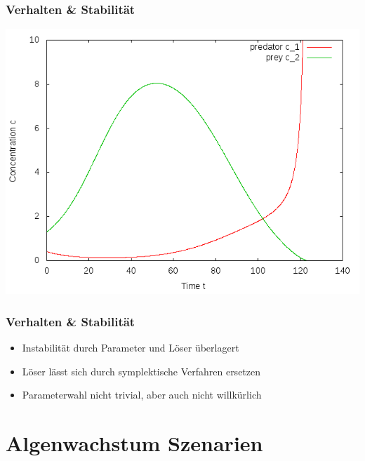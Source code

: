 \documentclass[12pt]{beamer}
\begin{document}
    \begin{frame}
    \frametitle{Verhalten \& Stabilität}
    \includegraphics[scale=0.5]{n2_explodiert.png}
    \end{frame}
    
    \begin{frame}
    \frametitle{Verhalten \& Stabilität}
    \begin{itemize}
      \item Instabilität durch Parameter und Löser überlagert
      \item Löser lässt sich durch symplektische Verfahren ersetzen
      \item Parameterwahl nicht trivial, aber auch nicht willkürlich
    \end{itemize}
    \end{frame}
    
    \section{Algenwachstum Szenarien}
    
\end{document}
